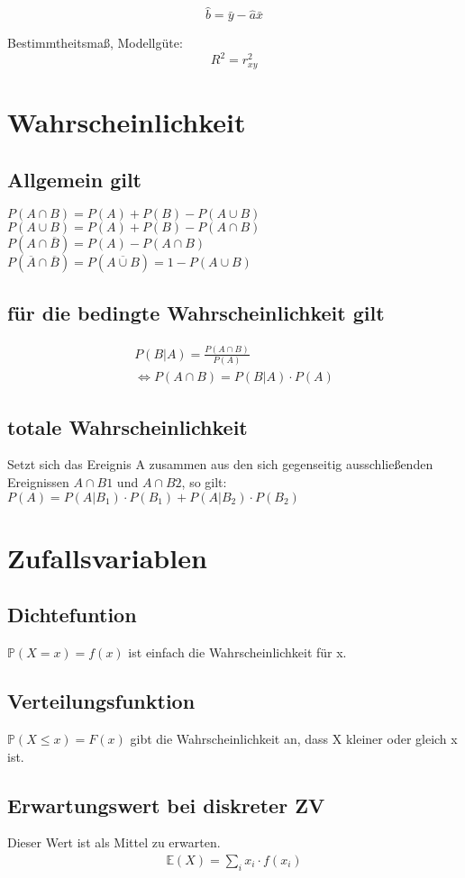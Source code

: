 \documentclass[a4paper, twocolumn]{article}
\begin{document}
        \begin{displaymath}
            \hat b = \bar y - \hat a \bar x
        \end{displaymath}
        
        Bestimmtheitsmaß, Modellgüte:
        \begin{displaymath}
          R^2 = r^2_{xy}
        \end{displaymath}
        
\section{Wahrscheinlichkeit}
	\subsection{Allgemein gilt} 
	$ P(A \cap B) = P(A) + P(B) - P(A \cup B)  $ \\
	$ P(A \cup B) = P(A) + P(B) - P(A \cap B) $ \\
	$ P(A \cap \overline B) = P(A) - P(A \cap B) $ \\
	$ P(\overline A  \cap \overline B) = P(\overline{A \cup B}) = 1 - P(A \cup B) $
	
	\subsection{für die bedingte Wahrscheinlichkeit gilt}
	\begin{gather*}
	P(B|A) = \frac{ P(A \cap B) }{ P(A) } \\
	\Leftrightarrow P(A \cap B) = P(B|A) \cdot P(A)
	\end{gather*}
	
	\subsection{totale Wahrscheinlichkeit}
	Setzt sich das Ereignis A zusammen aus den sich gegenseitig ausschließenden 
	Ereignissen $A \cap B1$ und $A \cap B2$, so gilt: \\
	$  P(A) = P(A | B_1) \cdot P(B_1) + P(A | B_2) \cdot P(B_2) $
	
\section{Zufallsvariablen}
	\subsection{Dichtefuntion} $ \mathbb{P}(X=x) = f(x) $ ist einfach die Wahrscheinlichkeit für x.

	\subsection{Verteilungsfunktion} $ \mathbb{P}(X \le x) = F(x) $ gibt die Wahrscheinlichkeit an, dass X kleiner oder gleich x ist.
	
	\subsection{Erwartungswert bei diskreter ZV}
	Dieser Wert ist als Mittel zu erwarten.
	\begin{gather*}
		\mathbb{E}(X) = \sum_i x_i \cdot f(x_i)
	\end{gather*}
\end{document}

